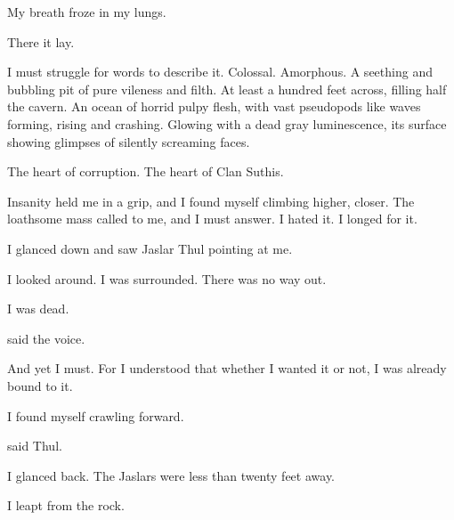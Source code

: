 \documentclass
  [a4paper,
   12pt,
   oneside
  ]%
  {article}
\begin{document}
My breath froze in my lungs. 

There it lay. 

I must struggle for words to describe it. 
Colossal. 
Amorphous. 
A seething and bubbling pit of pure vileness and filth. 
At least a hundred feet across, filling half the cavern. 
An ocean of horrid pulpy flesh, with vast pseudopods like waves forming, rising and crashing. 
Glowing with a dead gray luminescence, its surface showing glimpses of silently screaming faces. 

The heart of corruption. 
The heart of Clan Suthis. 


Insanity held me in a grip, and I found myself climbing higher, closer. 
The loathsome mass called to me, and I must answer.
I hated it. 
I longed for it. 


I glanced down and saw Jaslar Thul pointing at me.


I looked around. 
I was surrounded. 
There was no way out.

I was dead. 

 said the voice.

And yet I must. 
For I understood that whether I wanted it or not, I was already bound to it. 

I found myself crawling forward.

 said Thul.


I glanced back.
The Jaslars were less than twenty feet away. 


I leapt from the rock. 
\end{document}

